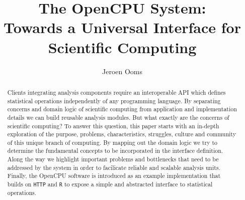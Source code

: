 \documentclass{article}
\author{Jeroen Ooms}
\title{The OpenCPU System:\\ Towards a Universal Interface for Scientific Computing}
\newcommand{\R}{\texttt{R}\xspace}
\newcommand{\HTTP}{\texttt{HTTP}\xspace}
\begin{document}
\maketitle

\begin{abstract}
Clients integrating analysis components require an interoperable API which defines statistical operations independently of any programming language. By separating concerns and domain logic of scientific computing from application and implementation details we can build reusable analysis modules. But what exactly are the concerns of scientific computing? To answer this question, this paper starts with an in-depth exploration of the purpose, problems, characteristics, struggles, culture and community of this unique branch of computing. By mapping out the domain logic we try to determine the fundamental concepts to be incorporated in the interface definition. Along the way we highlight important problems and bottlenecks that need to be addressed by the system in order to facilicate reliable and scalable analysis units. Finally, the OpenCPU software is introduced as an example implementation that builds on \HTTP and \R to expose a simple and abstracted interface to statistical operations.
\end{abstract}







 






\end{document}
